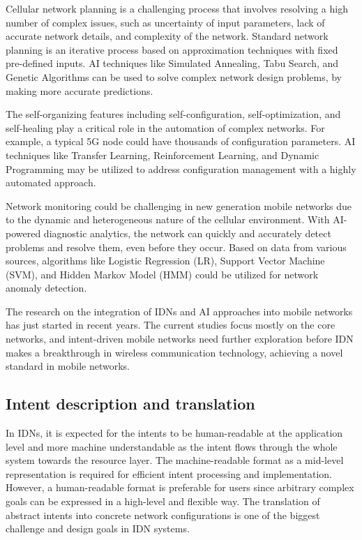 Cellular network planning is a challenging process that involves resolving a high number of complex issues, such as uncertainty of input parameters, lack of accurate network details, and complexity of the network. Standard network planning is an iterative process based on approximation techniques with fixed pre-defined inputs. AI techniques like Simulated Annealing, Tabu Search, and Genetic Algorithms can be used to solve complex network design problems, by making more accurate predictions.\cite{anuradha2017empowering}

The self-organizing features including self-configuration, self-optimization, and self-healing play a critical role in the automation of complex networks. For example, a typical 5G node could have thousands of configuration parameters. AI techniques like Transfer Learning, Reinforcement Learning, and Dynamic Programming may be utilized to address configuration management with a highly automated approach.\cite{anuradha2017empowering}

Network monitoring could be challenging in new generation mobile networks due to the dynamic and heterogeneous nature of the cellular environment. With AI-powered diagnostic analytics, the network can quickly and accurately detect problems and resolve them, even before they occur. Based on data from various sources, algorithms like Logistic Regression (LR), Support Vector Machine (SVM), and Hidden Markov Model (HMM) could be utilized for network anomaly detection.\cite{anuradha2017empowering}

The research on the integration of IDNs and AI approaches into mobile networks has just started in recent years. The current studies focus mostly on the core networks, and intent-driven mobile networks need further exploration before IDN makes a breakthrough in wireless communication technology, achieving a novel standard in mobile networks.


\subsection{Intent description and translation}
In IDNs, it is expected for the intents to be human-readable at the application level and more machine understandable as the intent flows through the whole system towards the resource layer. The machine-readable format as a mid-level representation is required for efficient intent processing and implementation. However, a human-readable format is preferable for users since arbitrary complex goals can be expressed in a high-level and flexible way. The translation of abstract intents into concrete network configurations is one of the biggest challenge and design goals in IDN systems.

